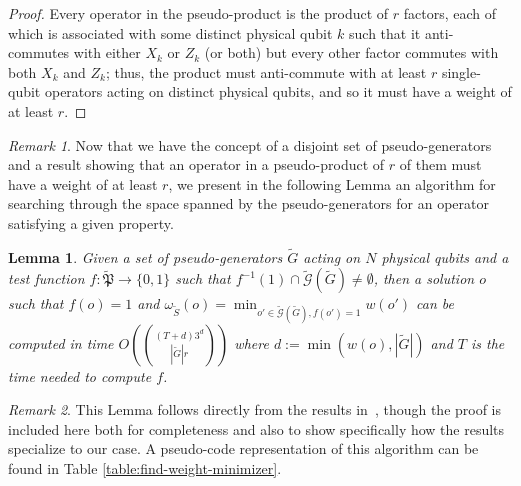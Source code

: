 \documentclass{amsbook}
\theoremstyle{plain}
\newtheorem{lemma}{Lemma}
\theoremstyle{definition}
\theoremstyle{remark}
\newtheorem{remark}{Remark}
\newcommand{\set}{\tilde}
\newcommand{\genfun}{\tilde{\mathcal{G}}}
\newcommand{\pauligroup}{{\set{\mathfrak{P}}}}
\newcommand{\om}{\omega}
\newcommand{\paren}[1]{\left(#1\right)}
\begin{document}
\begin{proof}
Every operator in the pseudo-product is the product of $r$ factors, each of which is associated with some distinct physical qubit $k$ such that it anti-commutes with either $X_k$ or $Z_k$ (or both) but every other factor commutes with both $X_k$ and $Z_k$;  thus, the product must anti-commute with at least $r$ single-qubit operators acting on distinct physical qubits, and so it must have a weight of at least $r$.
\end{proof}
\begin{remark}
Now that we have the concept of a disjoint set of pseudo-generators and a result showing that an operator in a pseudo-product of $r$ of them must have a weight of at least $r$, we present in the following Lemma an algorithm for searching through the space spanned by the pseudo-generators for an operator satisfying a given property.
\end{remark}

\begin{lemma}
\label{lemma:minimal-weight-search}
Given a set of pseudo-generators $\set G$ acting on $N$ physical qubits and a test function $f:\pauligroup\to\{0,1\}$ such that $f^{-1}(1)\cap\genfun(\set G)\ne\emptyset$, then a solution $o$ such that $f(o)=1$ and $\om_{\set S}(o)=\min_{o'\in \genfun(\set G), f(o')=1} w(o')$ can be computed in time $O\paren{(T+d)3^d\choose{|\set G|}{r}}$ where $d:=\min\paren{w(o),|\set G|}$ and $T$ is the time needed to compute $f$.
\end{lemma}

\begin{remark}
This Lemma follows directly from the results in~\cite{White:2006fj}, though the proof is included here both for completeness and also to show specifically how the results specialize to our case.  A pseudo-code representation of this algorithm can be found in Table \ref{table:find-weight-minimizer}.
\end{remark}
\end{document}
